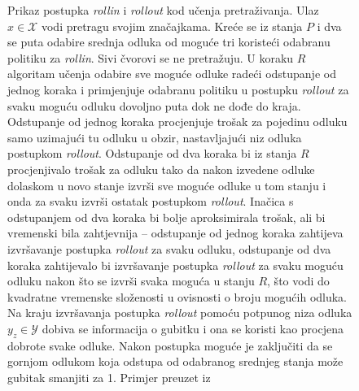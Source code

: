 \begin{figure}
\caption[Prikaz postupka \textit{rollin} i \textit{rollout} kod učenja
pretraživanja.]{Prikaz postupka \textit{rollin} i \textit{rollout} kod učenja
pretraživanja. Ulaz $x \in \mathcal{X}$ vodi pretragu svojim značajkama. Kreće
se iz stanja $P$ i dva se puta odabire srednja odluka od moguće tri koristeći
odabranu politiku za \textit{rollin}. Sivi čvorovi se ne pretražuju. U koraku
$R$ algoritam učenja odabire sve moguće odluke radeći odstupanje od jednog
koraka i primjenjuje odabranu politiku u postupku \textit{rollout} za svaku
moguću odluku dovoljno puta dok ne dođe do kraja. Odstupanje od jednog koraka
procjenjuje trošak za pojedinu odluku samo uzimajući tu odluku u obzir,
nastavljajući niz odluka postupkom \textit{rollout}. Odstupanje od dva koraka
bi iz stanja $R$ procjenjivalo trošak za odluku tako da nakon izvedene odluke
dolaskom u novo stanje izvrši sve moguće odluke u tom stanju i onda za svaku
izvrši ostatak postupkom \textit{rollout}. Inačica s odstupanjem od dva koraka
bi bolje aproksimirala trošak, ali bi vremenski bila zahtjevnija -- odstupanje
od jednog koraka zahtijeva izvršavanje postupka \textit{rollout} za svaku
odluku, odstupanje od dva koraka zahtijevalo bi izvršavanje postupka
\textit{rollout} za svaku moguću odluku nakon što se izvrši svaka moguća u
stanju $R$, što vodi do kvadratne vremenske složenosti u ovisnosti o broju
mogućih odluka. Na kraju izvršavanja postupka \textit{rollout} pomoću potpunog
niza odluka $y_z \in \mathcal{Y}$ dobiva se informacija o gubitku i ona se
koristi kao procjena dobrote svake odluke. Nakon postupka moguće je zaključiti
da se gornjom odlukom koja odstupa od odabranog srednjeg stanja može gubitak
smanjiti za 1. Primjer preuzet iz \citep[str.~3]{daume15lols}}
\label{fig:rollinout}
\end{figure}

